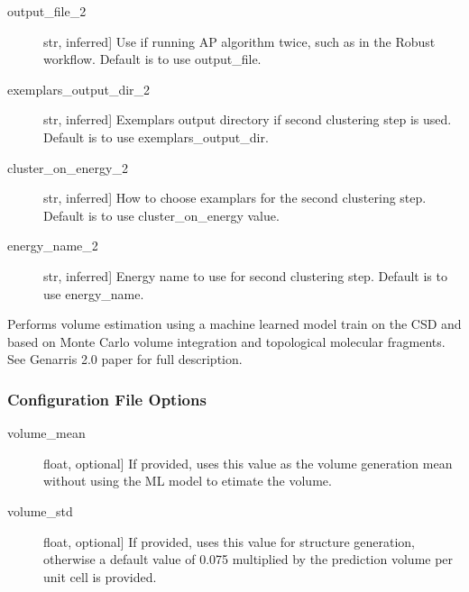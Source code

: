 \documentclass[letterpaper,10pt,english]{sphinxmanual}
\begin{document}
\begin{fulllineitems}
\begin{fulllineitems}
\begin{description}
\item[{output\_file\_2}] \leavevmode{[}str, inferred{]}
Use if running AP algorithm twice, such as in the Robust workflow.
Default is to use output\_file.

\item[{exemplars\_output\_dir\_2}] \leavevmode{[}str, inferred{]}
Exemplars output directory if second clustering step is used.
Default is to use exemplars\_output\_dir.

\item[{cluster\_on\_energy\_2}] \leavevmode{[}str, inferred{]}
How to choose examplars for the second clustering step. Default
is to use cluster\_on\_energy value.

\item[{energy\_name\_2}] \leavevmode{[}str, inferred{]}
Energy name to use for second clustering step. Default is to use
energy\_name.

\end{description}

\end{fulllineitems}


\begin{fulllineitems}
\label{\detokenize{index:Genarris.genarris_master.Genarris.Estimate_Unit_Cell_Volume}}
Performs volume estimation using a machine learned model train on the
CSD and based on Monte Carlo volume integration and topological
molecular fragments. See Genarris 2.0 paper for full description.
\subsubsection*{Configuration File Options}
\begin{description}
\item[{volume\_mean}] \leavevmode{[}float, optional{]}
If provided, uses this value as the volume generation mean without
using the ML model to etimate the volume.

\item[{volume\_std}] \leavevmode{[}float, optional{]}
If provided, uses this value for structure generation, otherwise
a default value of 0.075 multiplied by the prediction volume per
unit cell is provided.


\end{description}
\end{fulllineitems}
\end{fulllineitems}
\end{document}
